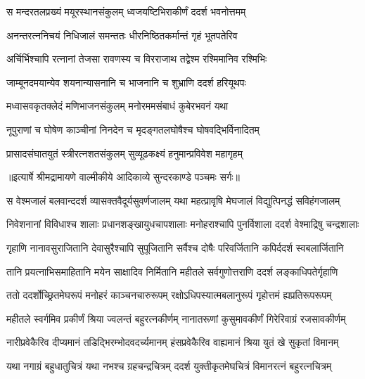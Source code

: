 \twolineshloka
{स मन्दरतलप्रख्यं मयूरस्थानसंकुलम्}
{ध्वजयष्टिभिराकीर्णं ददर्श भवनोत्तमम्} %

\twolineshloka
{अनन्तरत्ननिचयं निधिजालं समन्ततः}
{धीरनिष्ठितकर्मान्तं गृहं भूतपतेरिव} %

\twolineshloka
{अर्चिर्भिश्चापि रत्नानां तेजसा रावणस्य च}
{विरराजाथ तद्वेश्म रश्मिमानिव रश्मिभिः} %

\twolineshloka
{जाम्बूनदमयान्येव शयनान्यासनानि च}
{भाजनानि च शुभ्राणि ददर्श हरियूथपः} %

\twolineshloka
{मध्वासवकृतक्लेदं मणिभाजनसंकुलम्}
{मनोरममसंबाधं कुबेरभवनं यथा} %

\twolineshloka
{नूपुराणां च घोषेण काञ्चीनां निनदेन च}
{मृदङ्गतलघोषैश्च घोषवद्भिर्विनादितम्} %

\twolineshloka
{प्रासादसंघातयुतं स्त्रीरत्नशतसंकुलम्}
{सुव्यूढकक्ष्यं हनुमान्प्रविवेश महागृहम्} %


{॥इत्यार्षे श्रीमद्रामायणे वाल्मीकीये आदिकाव्ये सुन्दरकाण्डे पञ्चमः सर्गः॥}


\fourlineindentedshloka
{स वेश्मजालं बलवान्ददर्श}
{ व्यासक्तवैदूर्यसुवर्णजालम्}
{यथा महत्प्रावृषि मेघजालं}
{ विद्युत्पिनद्धं सविहंगजालम्} %

\fourlineindentedshloka
{निवेशनानां विविधाश्च शालाः}
{ प्रधानशङ्खायुधचापशालाः}
{मनोहराश्चापि पुनर्विशाला}
{ ददर्श वेश्माद्रिषु चन्द्रशालाः} %

\fourlineindentedshloka
{गृहाणि नानावसुराजितानि}
{ देवासुरैश्चापि सुपूजितानि}
{सर्वैश्च दोषैः परिवर्जितानि}
{ कपिर्ददर्श स्वबलार्जितानि} %

\fourlineindentedshloka
{तानि प्रयत्नाभिसमाहितानि}
{ मयेन साक्षादिव निर्मितानि}
{महीतले सर्वगुणोत्तराणि}
{ ददर्श लङ्काधिपतेर्गृहाणि} %

\fourlineindentedshloka
{ततो ददर्शोच्छ्रितमेघरूपं}
{ मनोहरं काञ्चनचारुरूपम्}
{रक्षोऽधिपस्यात्मबलानुरूपं}
{ गृहोत्तमं ह्यप्रतिरूपरूपम्} %

\fourlineindentedshloka
{महीतले स्वर्गमिव प्रकीर्णं}
{ श्रिया ज्वलन्तं बहुरत्नकीर्णम्}
{नानातरूणां कुसुमावकीर्णं}
{ गिरेरिवाग्रं रजसावकीर्णम्} %

\fourlineindentedshloka
{नारीप्रवेकैरिव दीप्यमानं}
{ तडिद्भिरम्भोदवदर्च्यमानम्}
{हंसप्रवेकैरिव वाह्यमानं}
{ श्रिया युतं खे सुकृतां विमानम्} %

\fourlineindentedshloka
{यथा नगाग्रं बहुधातुचित्रं}
{ यथा नभश्च ग्रहचन्द्रचित्रम्}
{ददर्श युक्तीकृतमेघचित्रं}
{ विमानरत्नं बहुरत्नचित्रम्} %

